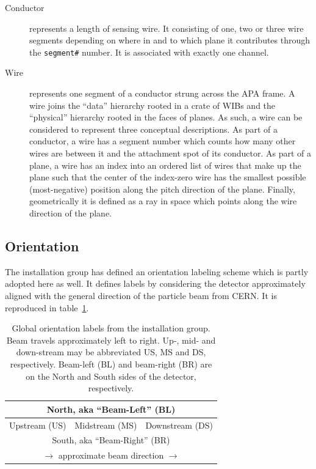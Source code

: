 \documentclass[pdftex,12pt,letter]{article}
\begin{document}
\begin{description}
\item[Conductor] represents a length of sensing wire. It consisting of
  one, two or three wire segments depending on where in and to which
  plane it contributes through the \texttt{segment\#} number.  It is
  associated with exactly one channel.

\item[Wire] represents one segment of a conductor strung across the
  APA frame.  A wire joins the ``data'' hierarchy rooted in a crate of
  WIBs and the ``physical'' hierarchy rooted in the faces of planes.
  As such, a wire can be considered to represent three conceptual
  descriptions.  As part of a conductor, a wire has a segment number
  which counts how many other wires are between it and the attachment
  spot of its conductor.  As part of a plane, a wire has an index into
  an ordered list of wires that make up the plane such that the center
  of the index-zero wire has the smallest possible (most-negative)
  position along the pitch direction of the plane.  Finally,
  geometrically it is defined as a ray in space which points along the
  wire direction of the plane.
\end{description}

\subsection{Orientation}

The installation group has defined an orientation labeling scheme
which is partly adopted here as well.  It defines labels by
considering the detector approximately aligned with the general
direction of the particle beam from CERN.  It is reproduced in
table~\ref{tab:global}.

\begin{table}[htp]
  \label{tab:global}
  \centering
  \begin{tabular}[h]{|c|c|c|}
    \hline
    \multicolumn{3}{|c|}{North, aka ``Beam-Left'' (BL)} \\
    \hline
    Upstream (US) & Midstream (MS) & Downstream (DS) \\
    \hline
    \multicolumn{3}{|c|}{South, aka ``Beam-Right'' (BR)} \\
    \hline
    \multicolumn{3}{c}{$\longrightarrow$ approximate beam direction $\longrightarrow$} \\    
  \end{tabular}
  \caption{Global orientation labels from the installation group.
    Beam travels approximately left to right.  Up-, mid- and
    down-stream may be abbreviated US, MS and DS, respectively.
    Beam-left (BL) and beam-right (BR) are on the North and South
    sides of the detector, respectively.}
\end{table}
\end{document}
